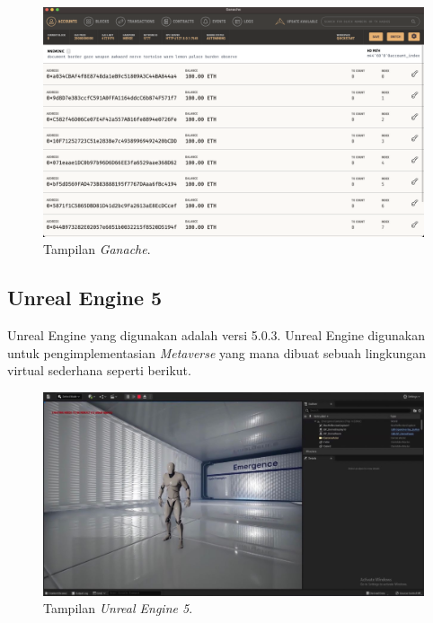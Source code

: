 \begin{figure}[H]
  \centering

  \includegraphics[scale=0.3]{gambar/ganache.png}

  \caption{Tampilan \emph{Ganache}.}
  \label{fig:ganache}
\end{figure}

\subsection{Unreal Engine 5}
Unreal Engine yang digunakan adalah versi 5.0.3. Unreal Engine digunakan untuk pengimplementasian \emph{Metaverse} yang mana dibuat sebuah lingkungan virtual sederhana seperti berikut.

\begin{figure}[H]
  \centering

  \includegraphics[scale=0.3]{gambar/ue5sample.jpg}

  \caption{Tampilan \emph{Unreal Engine 5}.}
  \label{fig:ue5sample}
\end{figure}

